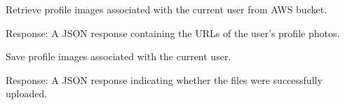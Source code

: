\documentclass[letterpaper,10pt,english]{sphinxmanual}
\begin{document}
\begin{fulllineitems}
\label{\detokenize{routes.images:routes.images.routes.get_profile_images}}
\pysigstartsignatures
{}
\pysigstopsignatures
\sphinxAtStartPar
Retrieve profile images associated with the current user from AWS bucket.
\begin{description}
\sphinxAtStartPar
Response: A JSON response containing the URLs of the user’s profile photos.

\end{description}

\end{fulllineitems}


\begin{fulllineitems}
\label{\detokenize{routes.images:routes.images.routes.save_profile_images}}
\pysigstartsignatures
{}
\pysigstopsignatures
\sphinxAtStartPar
Save profile images associated with the current user.
\begin{description}
\sphinxAtStartPar
Response: A JSON response indicating whether the files were successfully uploaded.

\end{description}

\end{fulllineitems}

\end{document}
